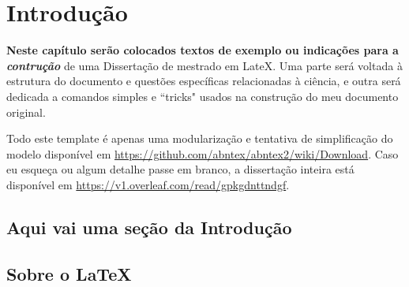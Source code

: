 \chapter{Introdução}
\label{cap:cap1}

\textbf{Neste capítulo serão colocados textos de exemplo ou indicações para a \textit{contrução}} de uma Dissertação de mestrado em LateX. Uma parte será voltada à estrutura do documento e questões específicas relacionadas à ciência, e outra será dedicada a comandos simples e ``tricks" usados na construção do meu documento original.

Todo este template é apenas uma modularização e tentativa de simplificação do modelo disponível em \url{https://github.com/abntex/abntex2/wiki/Download}. Caso eu esqueça ou algum detalhe passe em branco, a dissertação inteira está disponível em \url{https://v1.overleaf.com/read/gpkgdnttndgf}.


\section{Aqui vai uma seção da Introdução}

\section{Sobre o \LaTeX}